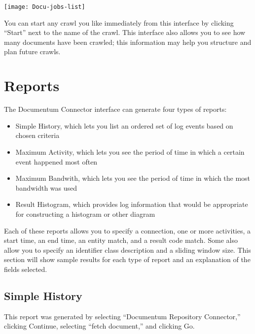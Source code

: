 \begin{changemargin}{1.5in}{0in}
\texttt{[image: Docu-jobs-list]}

You can start any crawl you like immediately from this interface by
clicking ``Start'' next to the name of the crawl. This interface also
allows you to see how many documents have been crawled; this information
may help you structure and plan future crawls.


\section{Reports}

The Documentum Connector interface can generate four types of reports:

\begin{itemize}

\item Simple History, which lets you list an ordered set of log events
based on chosen criteria

\item Maximum Activity, which lets you see the period of time in
which a certain event happened most often

\item Maximum Bandwith, which lets you see the period of time in
which the most bandwidth was used 

\item Result Histogram, which provides log information that would be
appropriate for constructing a histogram or other diagram

\end{itemize}

Each of these reports allows you to specify a connection, one or more
activities, a start time, an end time, an entity match, and a result code
match.  Some also allow you to specify an identifier class description
and a sliding window size. This section will show sample results for
each type of report and an explanation of the fields selected.

\subsection{Simple History}

This report was generated by selecting ``Documentum Repository Connector,'' 
clicking Continue, selecting ``fetch document,'' and clicking Go.


\end{changemargin}
